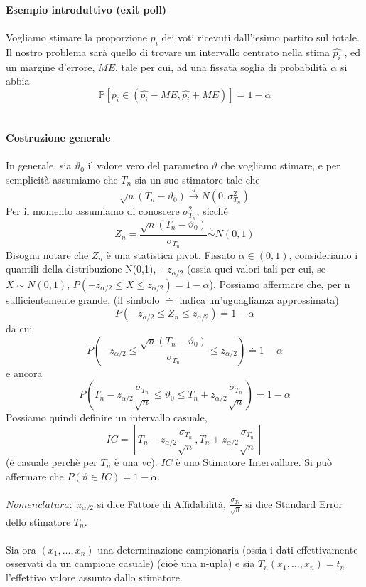 \noindent \textbf{Esempio introduttivo (exit poll)}
\\ \\
Vogliamo stimare la proporzione $p_i$ dei voti ricevuti dall'iesimo partito sul totale. Il nostro problema sarà quello di trovare un intervallo centrato nella stima $\hat{p_i}$ , ed un margine d'errore, $ME$, tale per cui, ad una fissata soglia di probabilità $\alpha$ si abbia 
$$\mathbb{P}[p_i \in (\hat{p_i} - ME,\hat{p_i} + ME)]=1 - \alpha$$
\\ \\
\noindent\textbf{Costruzione generale}
\\ \\
In generale, sia $\vartheta_0$ il valore vero del parametro $\vartheta$ che vogliamo stimare, e per semplicità assumiamo che $T_n$ sia un suo stimatore tale che 
$$\sqrt{n}(T_n - \vartheta_0)\stackrel{d}{\rightarrow}N(0,\sigma_{T_n}^2)$$
Per il momento assumiamo di conoscere $\sigma_{T_n}^2$, sicché
$$Z_n=\frac{\sqrt{n}(T_n - \vartheta_0)}{\sigma_{T_n}} \stackrel{a}{\sim}N(0,1)$$ Bisogna notare che $Z_n$ è una statistica pivot.
Fissato $\alpha \in (0,1)$, consideriamo i quantili della distribuzione N(0,1), $\pm z_{\alpha / 2}$ (ossia quei valori tali per cui, se $X \sim N(0,1)$, $P(-z_{\alpha / 2} \leq X \leq z_{\alpha / 2})=1-\alpha$). Possiamo affermare che, per n sufficientemente grande, (il simbolo $\stackrel{.}{=}$ indica un'uguaglianza approssimata) $$P(-z_{\alpha / 2} \leq Z_n \leq z_{\alpha / 2})\stackrel{.}{=}1-\alpha$$ da cui
$$P(-z_{\alpha / 2} \leq \frac{\sqrt{n}(T_n - \vartheta_0)}{\sigma_{T_n}} \leq z_{\alpha / 2})\stackrel{.}{=}1-\alpha $$ e ancora
$$P(T_n - z_{\alpha / 2} \frac{\sigma_{T_n}}{\sqrt{n}} \leq \vartheta_0 \leq T_n+z_{\alpha / 2} \frac{\sigma_{T_n}}{\sqrt{n}})\stackrel{.}{=}1-\alpha$$
Possiamo quindi definire un intervallo casuale, $$IC=\left[T_n - z_{\alpha / 2} \frac{\sigma_{T_n}}{\sqrt{n}},T_n + z_{\alpha / 2} \frac{\sigma_{T_n}}{\sqrt{n}}\right]$$ (è casuale perchè per $T_n$ è una vc). $IC$ è uno Stimatore Intervallare.
Si può affermare che $P(\vartheta \in IC) \stackrel {.}{=} 1 - \alpha$.
\\ \\
\noindent $\textit{Nomenclatura}:$
$z_{\alpha / 2}$ si dice Fattore di Affidabilità,
$\displaystyle\frac{\sigma_{T_n}}{\sqrt{n}}$ si dice Standard Error dello stimatore $T_n$.
\\ \\
Sia ora $(x_1,...,x_n)$ una determinazione campionaria (ossia i dati effettivamente osservati da un campione casuale) (cioè una n-upla) e sia $T_n(x_1,...,x_n)=t_n$ l'effettivo valore assunto dallo stimatore.

